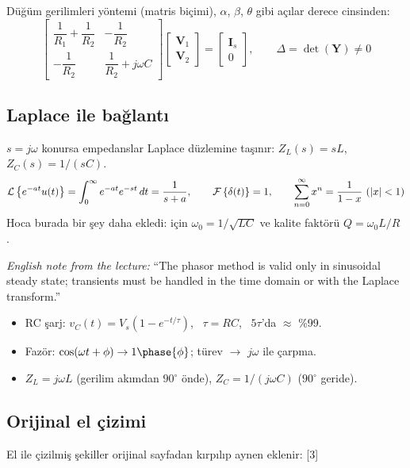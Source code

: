 \documentclass[11pt,a4paper]{article}
\begin{document}
Düğüm gerilimleri yöntemi (matris biçimi), $\alpha$, $\beta$, $\theta$ gibi açılar derece cinsinden:
\[
  \begin{bmatrix}
    \dfrac{1}{R_1} + \dfrac{1}{R_2} & -\dfrac{1}{R_2} \\[2mm]
    -\dfrac{1}{R_2} & \dfrac{1}{R_2} + j\omega C
  \end{bmatrix}
  \begin{bmatrix} \mathbf{V}_1 \\ \mathbf{V}_2 \end{bmatrix}
  =
  \begin{bmatrix} \mathbf{I}_s \\ 0 \end{bmatrix},
  \qquad
  \Delta = \det(\mathbf{Y}) \neq 0
\]


\subsection{Laplace ile bağlantı}
$s = j\omega$ konursa empedanslar Laplace düzlemine taşınır: $Z_L(s) = sL$, $Z_C(s) = 1/(sC)$.
\[
  \Lap{e^{-at}u(t)} = \int_{0}^{\infty} e^{-at} e^{-st}\,dt = \frac{1}{s+a}, \qquad
  \Fou{\delta(t)} = 1, \qquad \sum_{n=0}^{\infty} x^n = \frac{1}{1-x}\ (|x|<1)
\]
Hoca burada bir şey daha ekledi:  için
$\omega_0 = 1/\sqrt{LC}$ ve kalite faktörü $Q = \omega_0 L / R$ \okunamadi{}.

\textit{English note from the lecture:} ``The phasor method is valid only in sinusoidal steady
state; transients must be handled in the time domain or with the Laplace transform.''

\begin{ozet}
  \begin{itemize}
    \item RC şarj: $v_C(t) = V_s(1-e^{-t/\tau})$, \ $\tau = RC$, \ $5\tau$'da $\approx$ \%99.
    \item Fazör: $\cos(\omega t+\phi) \to 1\phase{\phi}$; türev $\to$ $j\omega$ ile çarpma.
    \item $Z_L = j\omega L$ (gerilim akımdan $90^\circ$ önde), $Z_C = 1/(j\omega C)$ ($90^\circ$ geride).
  \end{itemize}
\end{ozet}

\subsection*{Orijinal el çizimi}
El ile çizilmiş şekiller orijinal sayfadan kırpılıp aynen eklenir:
[3]
\end{document}
